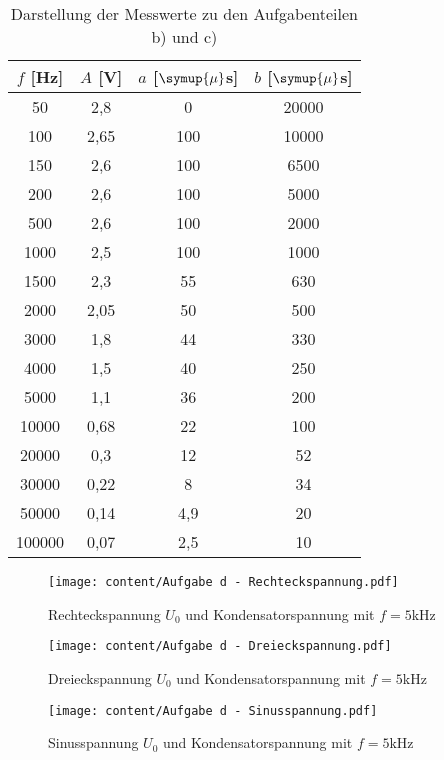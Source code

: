\begin{table}
  \centering
  \caption{Darstellung der Messwerte zu den Aufgabenteilen b) und c)}
  \label{tab:aufgaben cd}
  \begin{tabular}{c c c c}
    \toprule
    $f$ [Hz] & $A$ [V] & $a$ [$\symup{\mu}$s] & $b$ [$\symup{\mu}$s] \\
    \midrule
    50  &	2,8	& 0	& 20000 \\
    100 &	2,65 & 100 & 10000 \\
    150 &	2,6 &	100 & 6500 \\
    200 & 2,6 &	100 & 5000 \\ 
    500 &	2,6 &	100	& 2000 \\
    1000 & 2,5 &	100 & 1000 \\
    1500 & 2,3 & 55 & 630 \\
    2000 & 2,05 &	50 & 500 \\
    3000 & 1,8 & 44 & 330 \\
    4000 & 1,5 & 40 & 250 \\
    5000 & 1,1 & 36 & 200 \\
    10000 &	0,68 & 22 & 100 \\
    20000 &	0,3 & 12 & 52 \\
    30000 &	0,22 & 8 & 34 \\
    50000 &	0,14 & 4,9 & 20 \\
    100000 & 0,07 &	2,5 & 10 \\
    \bottomrule
  \end{tabular}
\end{table}

\begin{figure}
  \centering
  \texttt{[image: content/Aufgabe d - Rechteckspannung.pdf]}
  \caption{Rechteckspannung $U_{0}$ und Kondensatorspannung mit $f=5$kHz}
  \label{fig:aufgabe d - rechteckspannung}
\end{figure}

\begin{figure}
  \centering
  \texttt{[image: content/Aufgabe d - Dreieckspannung.pdf]}
  \caption{Dreieckspannung $U_{0}$ und Kondensatorspannung mit $f=5$kHz}
  \label{fig:aufgabe d - dreieckspannung}
\end{figure}

\begin{figure}
  \centering
  \texttt{[image: content/Aufgabe d - Sinusspannung.pdf]}
  \caption{Sinusspannung $U_{0}$ und Kondensatorspannung mit $f=5$kHz}
  \label{fig:aufgabe d - sinusspannung}
\end{figure}
